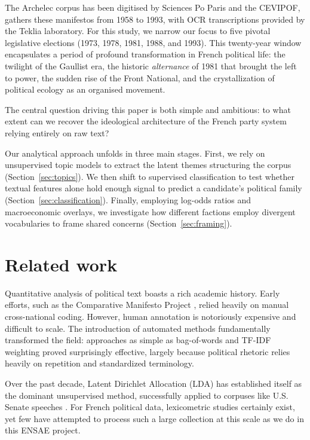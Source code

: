 \documentclass{article}
\begin{document}
The Archelec corpus has been digitised by Sciences Po Paris and the CEVIPOF, gathers these manifestos from 1958 to 1993, with OCR transcriptions provided by the Teklia laboratory. For this study, we narrow our focus to five pivotal legislative elections (1973, 1978, 1981, 1988, and 1993). This twenty-year window encapsulates a period of profound transformation in French political life: the twilight of the Gaullist era, the historic \textit{alternance} of 1981 that brought the left to power, the sudden rise of the Front National, and the crystallization of political ecology as an organised movement.

The central question driving this paper is both simple and ambitious: to what extent can we recover the ideological architecture of the French party system relying entirely on raw text? 

Our analytical approach unfolds in three main stages. First, we rely on unsupervised topic models to extract the latent themes structuring the corpus (Section~\ref{sec:topics}). We then shift to supervised classification to test whether textual features alone hold enough signal to predict a candidate's political family (Section~\ref{sec:classification}). Finally, employing log-odds ratios and macroeconomic overlays, we investigate how different factions employ divergent vocabularies to frame shared concerns (Section~\ref{sec:framing}).

\section{Related work}

Quantitative analysis of political text boasts a rich academic history. Early efforts, such as the Comparative Manifesto Project \citep{budge2001mapping}, relied heavily on manual cross-national coding. However, human annotation is notoriously expensive and difficult to scale. The introduction of automated methods fundamentally transformed the field: approaches as simple as bag-of-words and TF-IDF weighting proved surprisingly effective, largely because political rhetoric relies heavily on repetition and standardized terminology.

Over the past decade, Latent Dirichlet Allocation (LDA) has established itself as the dominant unsupervised method, successfully applied to corpuses like U.S. Senate speeches \citep{quinn2010analyze}. For French political data, lexicometric studies \citep{bonnafous2003analyse} certainly exist, yet few have attempted to process such a large collection at this scale as we do in this ENSAE project. 
\end{document}
